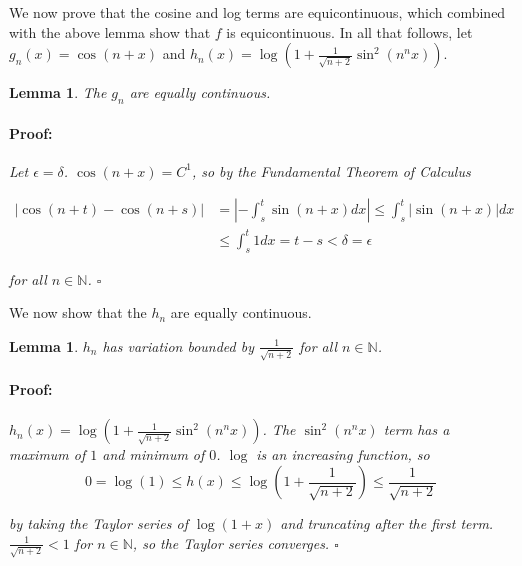 \documentclass{article}
\newenvironment{proof}{\paragraph{Proof:}}{\hfill$\square$}
\newtheorem{lemma}[theorem]{Lemma}
\newcommand{\N}{\mathbb{N}}
\begin{document}
We now prove that the cosine and log terms are equicontinuous, which combined with the above lemma show that $f$ is equicontinuous. In all that follows, let $g_n(x) = \cos(n+x)$ and $h_n(x) = \log(1 + \frac{1}{\sqrt{n+2}} \sin^2(n^n x))$.

\begin{lemma}
The $g_n$ are equally continuous.
\begin{proof}
Let $\epsilon = \delta$. $\cos(n+x) = C^1$, so by the Fundamental Theorem of Calculus

\begin{align*}
|\cos(n+t) - \cos(n+s)| &= |- \int_s^t \sin(n+x)dx| \leq \int_s^t |\sin(n+x)|dx \\
&\leq \int_s^t 1 dx = t-s < \delta = \epsilon
\end{align*}

for all $n \in \N$.
\end{proof}
\end{lemma}

We now show that the $h_n$ are equally continuous.

\begin{lemma}
\label{HnBoundedVariation}
$h_n$ has variation bounded by $\frac{1}{\sqrt{n+2}}$ for all $n \in \N$.
\begin{proof}
$h_n(x) = \log(1 + \frac{1}{\sqrt{n+2}} \sin^2(n^n x))$. The $\sin^2(n^n x)$ term has a maximum of $1$ and minimum of $0$. $\log$ is an increasing function, so 
\[
0 = \log(1) \leq h(x) \leq \log(1 + \frac{1}{\sqrt{n+2}}) \leq \frac{1}{\sqrt{n+2}}
\]

by taking the Taylor series of $\log(1+x)$ and truncating after the first term. $\frac{1}{\sqrt{n+2}} < 1$ for $n \in \N$, so the Taylor series converges.
\end{proof}
\end{lemma}
\end{document}
